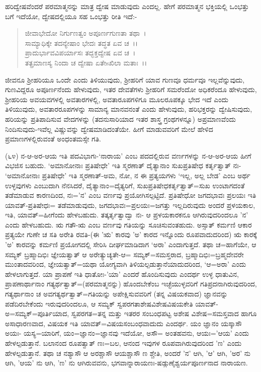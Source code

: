 ಹರಿದ್ವೇಷವೆಂದರೆ ಪರಮಾತ್ಮನನ್ನು ಮಾತ್ರ ದ್ವೇಷ ಮಾಡುವುದು ಎಂದಲ್ಲ. ಹೇಗೆ ಪರಮಾತ್ಮನ ಭಕ್ತಿಯಲ್ಲಿ ಒಂಭತ್ತು ಬಗೆ ಇದೆಯೋ, ದ್ವೇಷದಲ್ಲಿಯೂ ಸಹ ಒಂಭತ್ತು ರೀತಿ ಇದೆ:-

\begin{verse}
ಜೀವಾಭೇದೋ ನಿರ್ಗುಣತ್ವಂ ಅಪೂರ್ಣಗುಣತಾ ತಥಾ~।\\ ಸಾಮ್ಯಾಧಿಕ್ಕೇ ತದನ್ಯೇಷಾಂ ಭೇದಃ ತದ್ಧತ ಏವ ಚ~।।\\ ಪ್ರಾದುರ್ಭಾವವಿಪರ್ಯಾಸಃ ತದ್ಭಕ್ತದ್ವೇಷ ಏವ ಚ~।\\ ತತ್ಪ್ರಮಾಣಸ್ಯ ನಿಂದಾ ಚ ದ್ವೇಷಾ ಏತೇsಖಿಲಾ ಮತಾಃ~।।
\end{verse}


ಜೀವನೂ ಶ‍್ರೀಹರಿಯೂ ಒಂದೇ ಎಂದು ತಿಳಿಯುವುದು, ಶ‍್ರೀಹರಿಗೆ ಯಾವ ಗುಣವೂ ಧರ್ಮವೂ ಇಲ್ಲವೆನ್ನುವುದು, ಗುಣವಿದ್ದರೂ ಅಪೂರ್ಣನೆಂದು ಹೇಳುವುದು, ಇತರ ದೇವತೆಗಳು ಶ‍್ರೀಹರಿಗೆ ಸಮರೆಂದೋ ಅಧಿಕರೆಂದೂ ಹೇಳುವುದು, ಶ‍್ರೀಹರಿಯ ಅವಯವಗಳಲ್ಲಿ ಅವತಾರಗಳಲ್ಲಿ, ಅವತಾರೂಪಗಳಿಗೂ ಮೂಲರೂಪಕ್ಕೂ ಭೇದ ಇದೆ ಎಂದು ತಿಳಿಯುವುದು, ಅವತಾರರೂಪಗಳನ್ನು ಸಾಮಾನ್ಯ ಮಾನವನಂತೆ ಎಂದು ಹೇಳುವುದು, ಹರಿಭಕ್ತರನ್ನು ದ್ವೇಷಿಸುವುದು, ಹರಿಯನ್ನು ಪ್ರತಿಪಾದಿಸುವ ವೇದಗಳನ್ನು (ತದನುಸಾರಿಯಾದ ಇತರ ಶಾಸ್ತ್ರ ಗ್ರಂಥಗಳನ್ನೂ) ಅಪ್ರಮಾಣವೆಂದು ನಿಂದಿಸುವುದು-ಇವೆಲ್ಲ ವಿಷ್ಣುವನ್ನು ದ್ವೇಷಮಾಡಿದಂತೆಯೇ. ಹೀಗೆ ಮಾಡುವವರಿಗೆ ಮೇಲೆ ಹೇಳಿದ ಪ್ರಮಾಣಗಳಲ್ಲಿರುವಂತೆ ಅಂಧಂತಮಸ್ಸೇ ಗತಿ.

(೬೪) ನ-ಆ-ಅರ-ಆಯ ಇತಿ ಪದವಿಭಾಗಃ-`ನಾರಾಯ' ಎಂಬ ಪದದಲ್ಲಿರುವ ವರ್ಣಗಳನ್ನು ನ-ಆ-ಅರ-ಆಯ ಹೀಗೆ ವಿಭಜಿಸ ಬಹುದು. `ಅಮಾನೋನಾಃ ಪ್ರತಿಷೇಧೇ' ಇತಿ ಸ್ಮರಣಾತ್ ದೈತ್ಯಾನಾಂ ಸುಖಪ್ರತಿಷೇಧ ಕರ್ತೃತ್ವಾತ್ ನಃ- `ಅಮಾನೋನಾಃ ಪ್ರತಿಷೇಧೇ' ಇತಿ ಸ್ಮರಣಾತ್-ಅಮ, ನೋ, ನ ಈ ಪ್ರತ್ಯಯಗಳು `ಇಲ್ಲ, ಅಲ್ಲ ಬೇಡ' ಎಂಬ ಅರ್ಥ ಉಳ್ಳವುಗಳು ಎಂಬುದಾಗಿ ನೆನಸಿದರೆ, ದೈತ್ಯಾನಾಂ=ದೈತ್ಯರಿಗೆ, ಸುಖಪ್ರತಿಷೇಧಕರ್ತೃತ್ವಾತ್=ಸುಖ ಉಂಟಾಗದಂತೆ ತಡೆಮಾಡುವ ಕಾರಣದಿಂದ, ನಃ='ನ' ಎಂಬ ವರ್ಣವು ಪ್ರಯೋಗಿಸಲ್ಪಟ್ಟಿದೆ. ಪ್ರತಿಷೇಧೋ ಜಗದಭಾವಃ ಪ್ರಲಯಃ ಇತಿ ಯಾವತ್-ಪ್ರತಿಷೇಧಃ= ತಡೆಮಾಡುವುದು, ಜಗದಭಾವಃ=ಪ್ರಲಯಃ=ಜಗತ್ತು ಇಲ್ಲದಿರುವುದು ಅಂದರೆ ಪ್ರಳಯಕಾಲ, ಇತಿ, ಯಾವತ್=ಹೀಗೆಂದು ಹೇಳಬಹುದು. ತತ್ಕರ್ತೃತ್ವಾದ್ವಾ ನಃ- ಆ ಪ್ರಳಯಕಾರಕನೂ ಆಗಿರುವುದರಿಂದಲೂ 'ನ' ಎಂದು ಹೇಳಬಹುದು. ಋ ಗತೌ-ಋ ಎಂಬ ವರ್ಣವು ಗತಿಯನ್ನು ಸೂಚಿಸುವಂತಹುದು. ಅಸ್ಸಾತ್ ಕರ್ಮಣಿ ಆಕಾರ ಪ್ರತ್ಯಯೇ ಗುಣೇ ಚ ಸತಿ ಅರೇತಿ ರವತಿ-(ಈ 'ಋ' ಕಾರವು 'ಅ' ಕಾರದ ಇನ್ನೊಂದು ರೂಪವಾದುದರಿಂದ) ಋ ಕಾರಕ್ಕೆ 'ಅ' ಕಾರವನ್ನು ಕರ್ಮಣಿ ಪ್ರಯೋಗದಲ್ಲಿ ಸೇರಿಸಿ ದೀರ್ಘಮಾಡಿದಾಗ `ಅರಾ' ಎಂದಾಗುತ್ತದೆ. ತಥಾ ಚ=ಹಾಗೆಯೇ, ಆ ಸಮ್ಯಕ್ ಬ್ರಹ್ಮಾದಿಭಿಃ ಜ್ಞೇಯತ್ವಾತ್ ಆ ಅರೇತ್ಯುಚ್ಯತೇ-ಆ= ಸಮ್ಯಕ್=ಸಮಸ್ತರಾದ, ಬ್ರಹ್ಮಾದಿಭಿಃ=ಬ್ರಹ್ಮದೇವರೇ ಮುಂತಾದವರಿಂದ, ಜ್ಞೇಯತ್ವಾತ್=ಯಥಾ ಯೋಗ್ಯವಾಗಿ ತಿಳಿಯಲ್ಪಡುತ್ತಾನೆಯಾದುದರಿಂದ, `ಆ=ಅರಾ' ಎಂದು ಹೇಳಲಾಗುತ್ತದೆ. ಯಾ ಪ್ರಾಪಣೆ ಇತಿ ಧಾತೋಃ-'ಯಾ' ಎಂದರೆ ಹೊಂದಿಸುವುದು ಎಂದರ್ಥ ಉಳ್ಳ ಧಾತುವಿನ, ಪ್ರಾಪಣಾರ್ಥಾನಾಂ ಗತ್ಯರ್ಥತ್ವಾತ್=(ಪರಮಾತ್ಮನನ್ನು) ಹೊಂದಬೇಕೆಂಬ ಇಚ್ಛೆಯುಳ್ಳವರಿಗೆ ಗತಿಪ್ರದನಾಗಿರುವುದರಿಂದ, ಗತ್ಯರ್ಥಾನಾಂ ಚ ಅವಗತ್ಯರ್ಥತ್ವಾತ್=ಗತಿಯನ್ನು ಅಪೇಕ್ಷಿಸುವವರಿಗೆ (ತನ್ನ ವಿಷಯಕವಾದ) ಜ್ಞಾನವನ್ನು ಪಡೆದಿರಬೇಕೆಂದು ಇರುವುದರಿಂದಲೂ, ಆ ಸಮ್ಯಕ್ ಸ್ವಪರಗತಾಶೇಷವಿಶೇಷವಿಷಯಕೇತಿ ಯಾವತ್-ಅ=ಸಮ್ಯಕ್=ಪೂರ್ತಿಯಾದ, ಸ್ವಪರಗತ=ತನ್ನ ಮತ್ತು ಇತರರ ಸಂಬಂಧಪಟ್ಟ ಅಶೇಷ ವಿಶೇಷ=ಸಮಸ್ತವಾದ ಹಾಗೂ ಅಸಾಧಾರಣವಾದ, ವಿಷಯಕ ಇತಿ ಯಾವತ್=ವಿಷಯಸಂಬಂಧವಾದುದು ಎಂದರ್ಥ. ಯಂ ಜ್ಞಾನಂ ಯಸ್ಕಾಸೌ ಅಯಃ- ಯಸ್ಯ=ಯಾರಿಗೆ, ಯಂ=ಜ್ಞಾನಂ=ಜ್ಞಾನವು ಇದೆಯೋ, ಅಸೌ= ಅಂತಹವನು, ಆಯಃ='ಆಯ' ಎಂದು ಹೇಳಲ್ಪಡುತ್ತಾನೆ. ಬಲಾನಂದ ರೂಪತ್ವಾತ್ ಣಃ=ಬಲ, ಆನಂದ ಇವುಗಳ ರೂಪವಾಗಿರುವುದರಿಂದ 'ಣ' ಎಂದು ಹೇಳಲ್ಪಡುತ್ತಾನೆ. ತಥಾ ಚ ನಶ್ಯಾಸೌ ಆ ಅರಶ್ಚಾಸೌ ಆಯಶ್ಚಾಸೌ ಣ ಶ್ಚೇತಿ, ಅಂದರೆ 'ನ' ಆಗಿ, 'ಆ' ಆಗಿ, 'ಅರ' ನು ಆಗಿ, 'ಆಯ' ನು ಆಗಿ, 'ಣ' ನು ಆಗಿರುವವನು, ಭಗವಾನ್ನಾರಾಯಣಃ-ಷಡ್ಗುಣೈಶ್ವರ್ಯಪೂರ್ಣನಾದ ನಾರಾಯಣ.

